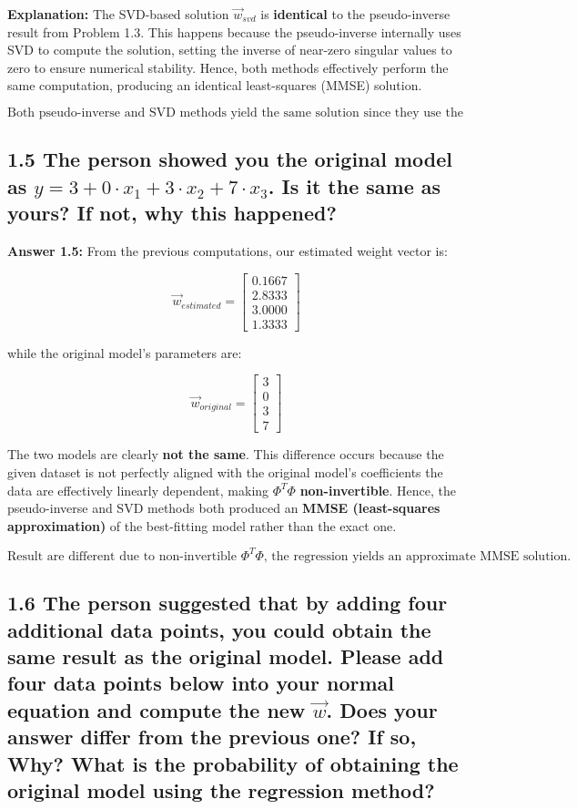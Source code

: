 \documentclass[12pt]{article}
\begin{document}
\textbf{Explanation:}  
The SVD-based solution $\vec{w}_{svd}$ is \textbf{identical} to the pseudo-inverse result from Problem 1.3.  
This happens because the pseudo-inverse internally uses SVD to compute the solution, setting the inverse of near-zero singular values to zero to ensure numerical stability.  
Hence, both methods effectively perform the same computation, producing an identical least-squares (MMSE) solution.

\[
\boxed{\text{Both pseudo-inverse and SVD methods yield the same solution since they use the same mathematical principle.}}
\]

\subsection*{1.5
The person showed you the original model as $y = 3 + 0 \cdot x_1 + 3 \cdot x_2 + 7 \cdot x_3$. Is it the same as yours? If not, why this happened?}

\textbf{Answer 1.5:}  
From the previous computations, our estimated weight vector is:

\[
\vec{w}_{estimated} =
\begin{bmatrix}
0.1667\\
2.8333\\
3.0000\\
1.3333
\end{bmatrix}
\]

while the original model’s parameters are:

\[
\vec{w}_{original} =
\begin{bmatrix}
3\\
0\\
3\\
7
\end{bmatrix}
\]

The two models are clearly \textbf{not the same}.  
This difference occurs because the given dataset is not perfectly aligned with the original model’s coefficients the data are effectively linearly dependent, making $\Phi^T\Phi$ \textbf{non-invertible}.  
Hence, the pseudo-inverse and SVD methods both produced an \textbf{MMSE (least-squares approximation)} of the best-fitting model rather than the exact one.

\[
\boxed{\text{Result are different due to non-invertible }\Phi^T\Phi\text{, the regression yields an approximate MMSE solution.}}
\]


\subsection*{1.6
The person suggested that by adding four additional data points, you could obtain the same result as the original model. Please add four data points below into your normal equation and compute the new $\vec{w}$. Does your answer differ from the previous one? If so, Why? What is the probability of obtaining the original model using the regression method?}
\end{document}
